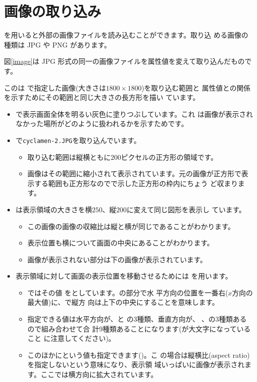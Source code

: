 \section{画像の取り込み}
を用いると外部の画像ファイルを読み込むことができます。取り込
める画像の種類は JPG や PNG があります。

図\ref{image}は JPG 形式の同一の画像ファイルを属性値を変えて取り込んだものです。

この\SVG は
で指定した画像(大きさは$1800\times1800$)を取り込む範囲と
属性値との関係を示すためにその範囲と同じ大きさの長方形を描い
ています。
{}
\begin{itemize}
 \item {} で表示画面全体を明るい灰色に塗りつぶしています。これ
       は画像が表示されなかった場所がどのように扱われるかを示すためです。
 \item {}で\texttt{cyclamen-2.JPG}を取り込んでいます。
\begin{itemize}
 \item 取り込む範囲は縦横ともに$200$ピクセルの正方形の領域です。
 \item 画像はその範囲に縮小されて表示されています。元の画像が正方形で表
       示する範囲も正方形なのでで示した正方形の枠内にちょう
       ど収まります。
\end{itemize}
 \item {}は表示領域の大きさを横$250$、縦$200$に変えて同じ図形を表示し
       ています。
\begin{itemize}
 \item この画像の画像の収縮比は縦と横が同じであることがわかります。
 \item 表示位置も横について画面の中央にあることがわかります。
 \item 画像が表示されない部分は下の画像が表示されています。
\end{itemize}       
 \item 表示領域に対して画面の表示位置を移動させるためには
       を用います。
\begin{itemize}
 \item {}ではその値
       をとしています。の部分で水
       平方向の位置を一番右($x$方向の最大値)に、で縦方
       向は上下の中央にすることを意味します。
 \item 指定できる値は水平方向が、と
       の3種類、垂直方向が、
       、の3種類あるので組み合わせて合
       計9種類あることになります(が大文字になっていること
       に注意してください)。
 \item このほかにという値も指定できます()。こ
       の場合は縦横比(aspect ratio)を指定しないという意味になり、表示領
       域いっぱいに画像が表示されます。ここでは横方向に拡大されています。
\end{itemize}
\end{itemize}
